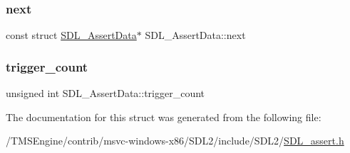 \mbox{\label{struct_s_d_l___assert_data_a2081dcf06dce4df497e423bccddfc099}} 
\subsubsection{\texorpdfstring{next}{next}}
{\footnotesize\ttfamily const struct \hyperlink{struct_s_d_l___assert_data}{S\+D\+L\+\_\+\+Assert\+Data}$\ast$ S\+D\+L\+\_\+\+Assert\+Data\+::next}

\mbox{\label{struct_s_d_l___assert_data_a230bbcc2d115aab04cf817773e08eb5b}} 
\subsubsection{\texorpdfstring{trigger\+\_\+count}{trigger\_count}}
{\footnotesize\ttfamily unsigned int S\+D\+L\+\_\+\+Assert\+Data\+::trigger\+\_\+count}



The documentation for this struct was generated from the following file\+:\begin{DoxyCompactItemize}
\item 
/\+T\+M\+S\+Engine/contrib/msvc-\/windows-\/x86/\+S\+D\+L2/include/\+S\+D\+L2/\hyperlink{_s_d_l__assert_8h}{S\+D\+L\+\_\+assert.\+h}\end{DoxyCompactItemize}
